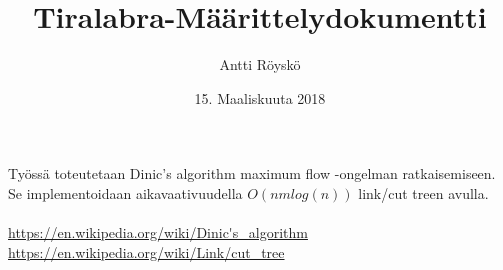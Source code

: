 \documentclass{article}
\title{Tiralabra-M\"a\"arittelydokumentti}
\author{Antti R\"oysk\"o}
\date{15. Maaliskuuta 2018}
\begin{document}
\maketitle

Ty\"oss\"a toteutetaan Dinic's algorithm maximum flow -ongelman ratkaisemiseen. Se implementoidaan aikavaativuudella $O(nm log(n))$ link/cut treen avulla.\\
\\
\url{https://en.wikipedia.org/wiki/Dinic's_algorithm}\\
\url{https://en.wikipedia.org/wiki/Link/cut_tree}\\
\end{document}
